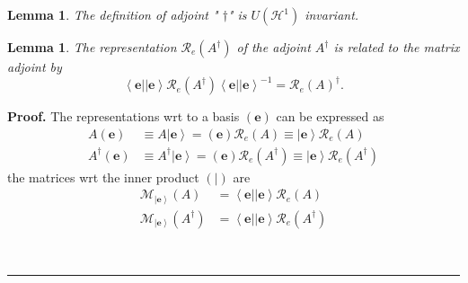 \documentclass[aps,preprint]{revtex4}%
\newtheorem{lemma}[theorem]{Lemma}
\newenvironment{proof}[1][Proof]{\noindent\textbf{#1.} }{\ \rule{0.5em}{0.5em}}
\begin{document}
\begin{lemma}
The definition of adjoint " $\dagger$" is $U\left(  \mathcal{H}^{1}\right)  $ invariant.
\end{lemma}

\begin{lemma}
The representation $\mathcal{R}_{e}\left(  A^{\dagger}\right)  $ of the
adjoint $A^{\dagger}$ is related to the matrix adjoint by%
\begin{equation}
\left\langle \mathbf{e}\right\vert \left\vert \mathbf{e}\right\rangle
\mathcal{R}_{e}\left(  A^{\dagger}\right)  \left\langle \mathbf{e}\right\vert
\left\vert \mathbf{e}\right\rangle ^{-1}=\mathcal{R}_{e}\left(  A\right)
^{\dagger}.
\end{equation}

\end{lemma}

\begin{proof}
The representations wrt to a basis $\left(  \mathbf{e}\right)  $ can be
expressed as
\begin{align}
A\left(  \mathbf{e}\right)   &  \equiv A\left\vert \mathbf{e}\right\rangle
=\left(  \mathbf{e}\right)  \mathcal{R}_{e}\left(  A\right)  \equiv\left\vert
\mathbf{e}\right\rangle \mathcal{R}_{e}\left(  A\right) \\
A^{\dagger}\left(  \mathbf{e}\right)   &  \equiv A^{\dagger}\left\vert
\mathbf{e}\right\rangle =\left(  \mathbf{e}\right)  \mathcal{R}_{e}\left(
A^{\dagger}\right)  \equiv\left\vert \mathbf{e}\right\rangle \mathcal{R}%
_{e}\left(  A^{\dagger}\right)
\end{align}
the matrices wrt the inner product $\left(  \left.  {}\right\vert \right)  $
are
\begin{align}
\mathcal{M}_{\left\vert \mathbf{e}\right\rangle }\left(  A\right)   &
=\left\langle \mathbf{e}\right\vert \left\vert \mathbf{e}\right\rangle
\mathcal{R}_{e}\left(  A\right) \\
\mathcal{M}_{\left\vert \mathbf{e}\right\rangle }\left(  A^{\dagger}\right)
&  =\left\langle \mathbf{e}\right\vert \left\vert \mathbf{e}\right\rangle
\mathcal{R}_{e}\left(  A^{\dagger}\right)
\end{align}

\end{proof}
\end{document}
